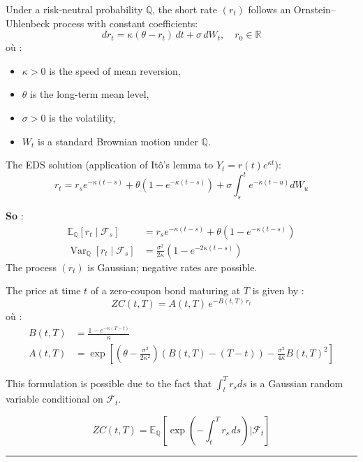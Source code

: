 \begin{f}
	
	Under a risk-neutral probability $\mathbb{Q}$, the short rate $(r_t)$ follows an Ornstein–Uhlenbeck process with constant coefficients:
	\[
	dr_t = \kappa(\theta - r_t)\, dt + \sigma\, dW_t, \quad r_0 \in \mathbb{R}
	\]
	où :
	\begin{itemize}[nosep]
		\item $\kappa > 0$ is the speed of mean reversion,
		\item $\theta$ is the long-term mean level,
		\item $\sigma > 0$ is the volatility,
		\item $W_t$ is a standard Brownian motion under $\mathbb{Q}$.
	\end{itemize}
	
The EDS solution (application of Itô’s lemma to $Y_{t}=r(t) e^{\kappa t}$):
	\[
	r_t = r_s e^{-\kappa(t-s)} + \theta(1 - e^{-\kappa(t-s)}) + \sigma \int_s^t e^{-\kappa(t-u)} dW_u
	\]
	
	\textbf{So} :
	\[
	\begin{aligned}
		\mathbb{E}_\mathbb{Q}[r_t \mid \mathcal{F}_s] &= r_s e^{-\kappa(t-s)} + \theta(1 - e^{-\kappa(t-s)}) \\
		\operatorname{Var}_\mathbb{Q}[r_t \mid \mathcal{F}_s] &= \frac{\sigma^2}{2\kappa} \left(1 - e^{-2\kappa(t-s)}\right)
	\end{aligned}
	\]
The process $(r_t)$ is Gaussian; negative rates are possible.
	
\end{f}

\begin{f}

The price at time $t$ of a zero-coupon bond maturing at $T$ is given by :
\[
ZC(t, T) = A(t, T) \, e^{-B(t, T)\, r_t}
\]
où :
\[
\begin{aligned}
	B(t, T) &= \frac{1 - e^{-\kappa(T - t)}}{\kappa} \\
	A(t, T) &= \exp \left[ \left(\theta - \frac{\sigma^2}{2\kappa^2}\right) (B(t, T) - (T - t)) - \frac{\sigma^2}{4\kappa} B(t, T)^2 \right]
\end{aligned}
\]

This formulation is possible due to the fact that $\int_t^T r_s ds$ is a Gaussian random variable conditional on $\mathcal{F}_t$.

\[
ZC(t, T) = \mathbb{E}_\mathbb{Q} \left[ \exp\left( -\int_t^T r_s\, ds \right) \Big| \mathcal{F}_t \right]
\]

\end{f}
\hrule

